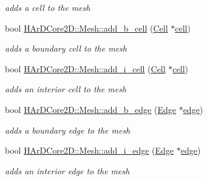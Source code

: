 \begin{DoxyCompactItemize}
\begin{DoxyCompactList}\small\item\em adds a cell to the mesh \end{DoxyCompactList}\item 
\mbox{\label{group__Mesh_ga440c6f4a38af3d6c48d25fa416f24366}} 
bool \hyperlink{group__Mesh_ga440c6f4a38af3d6c48d25fa416f24366}{H\+Ar\+D\+Core2\+D\+::\+Mesh\+::add\+\_\+b\+\_\+cell} (\hyperlink{classHArDCore2D_1_1Cell}{Cell} $\ast$\hyperlink{classHArDCore2D_1_1Mesh_ae07b938c57cf57e3bb9c76d3df1eb549}{cell})
\begin{DoxyCompactList}\small\item\em adds a boundary cell to the mesh \end{DoxyCompactList}\item 
\mbox{\label{group__Mesh_ga3a47d6ebfdb4254c57b7b672b51a992b}} 
bool \hyperlink{group__Mesh_ga3a47d6ebfdb4254c57b7b672b51a992b}{H\+Ar\+D\+Core2\+D\+::\+Mesh\+::add\+\_\+i\+\_\+cell} (\hyperlink{classHArDCore2D_1_1Cell}{Cell} $\ast$\hyperlink{classHArDCore2D_1_1Mesh_ae07b938c57cf57e3bb9c76d3df1eb549}{cell})
\begin{DoxyCompactList}\small\item\em adds an interior cell to the mesh \end{DoxyCompactList}\item 
\mbox{\label{group__Mesh_ga170b0f0bf5751a8e0cba0f5efccc66c4}} 
bool \hyperlink{group__Mesh_ga170b0f0bf5751a8e0cba0f5efccc66c4}{H\+Ar\+D\+Core2\+D\+::\+Mesh\+::add\+\_\+b\+\_\+edge} (\hyperlink{classHArDCore2D_1_1Edge}{Edge} $\ast$\hyperlink{classHArDCore2D_1_1Mesh_acad7cdf3d2c00fa6fc23ff77c63c7d1a}{edge})
\begin{DoxyCompactList}\small\item\em adds a boundary edge to the mesh \end{DoxyCompactList}\item 
\mbox{\label{group__Mesh_ga1e55100bee1027f4ab3980bf020c5df7}} 
bool \hyperlink{group__Mesh_ga1e55100bee1027f4ab3980bf020c5df7}{H\+Ar\+D\+Core2\+D\+::\+Mesh\+::add\+\_\+i\+\_\+edge} (\hyperlink{classHArDCore2D_1_1Edge}{Edge} $\ast$\hyperlink{classHArDCore2D_1_1Mesh_acad7cdf3d2c00fa6fc23ff77c63c7d1a}{edge})
\begin{DoxyCompactList}\small\item\em adds an interior edge to the mesh \end{DoxyCompactList}\item 

\end{DoxyCompactItemize}
